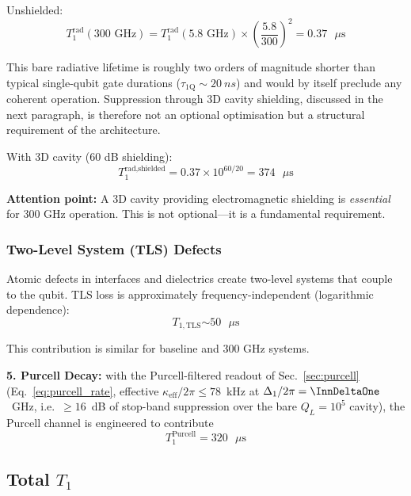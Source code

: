 Unshielded:
\begin{equation}
T_1^{\text{rad}}(300 \text{ GHz}) = T_1^{\text{rad}}(5.8 \text{ GHz}) \times \left(\frac{5.8}{300}\right)^2 = \boxed{0.37 \text{ }\mu\text{s}}
\end{equation}

This bare radiative lifetime is roughly two orders of magnitude shorter
than typical single-qubit gate durations
($\tau_{\text{1Q}} \sim \SI{20}{ns}$) and would by itself preclude any
coherent operation. Suppression through 3D cavity shielding, discussed
in the next paragraph, is therefore not an optional optimisation but a
structural requirement of the architecture.

With 3D cavity (60 dB shielding):
\begin{equation}
T_1^{\text{rad,shielded}} = 0.37 \times 10^{60/20} = \boxed{374 \text{ }\mu\text{s}}
\end{equation}

\noindent\textbf{Attention point:} A 3D cavity providing electromagnetic shielding is \textit{essential} for 300 GHz operation. This is not optional—it is a fundamental requirement.

\subsubsection{Two-Level System (TLS) Defects}

Atomic defects in interfaces and dielectrics create two-level systems that couple to the qubit. TLS loss is approximately frequency-independent (logarithmic dependence):
\begin{equation}
T_{1,\text{TLS}} \boxed{\sim 50 \text{ $\mu$s}}
\end{equation}

This contribution is similar for baseline and 300 GHz systems.

\textbf{5. Purcell Decay:} with the Purcell-filtered readout of
Sec.~\ref{sec:purcell} (Eq.~\ref{eq:purcell_rate}, effective
$\kappa_{\text{eff}}/2\pi \leq 78$~kHz at $\Delta_1/2\pi = \InnDeltaOne$~GHz,
i.e.\ $\geq 16$~dB of stop-band suppression over the bare $Q_L = 10^5$
cavity), the Purcell channel is engineered to contribute
\begin{equation}
T_1^{\text{Purcell}} = \boxed{320 \text{ }\mu\text{s}}
\end{equation}

\subsection{Total $T_1$}

